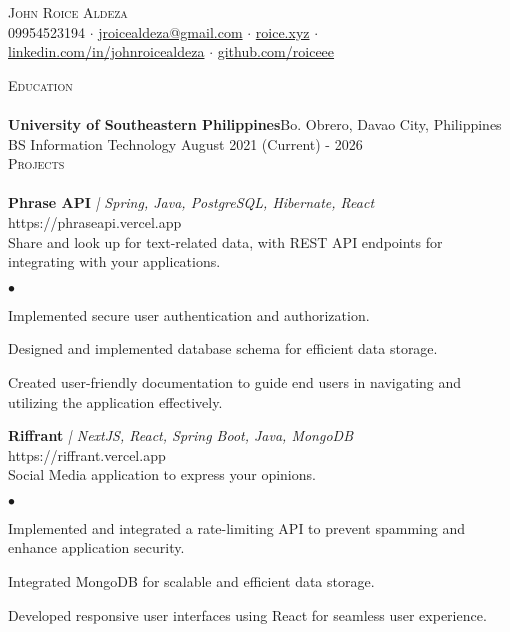 \documentclass[a4paper]{article}
\newcommand{\lineunder} {
        \vspace*{-8pt} \\
        \hspace*{-18pt} \hrulefill \\
    }
\newcommand{\header} [1] {
        {\vspace*{4mm} \hspace*{-18pt}\vspace*{8pt} \textsc{#1}}
        \vspace*{-6pt} \lineunder
    }
\newenvironment{achievements}{
        \begin{list}
            {$\bullet$}{\topsep 0pt \itemsep -2pt}}{\vspace*{4pt}
        \end{list}
    }
\begin{document}
    \vspace*{-40pt}

    \vspace*{-10pt}
    \begin{center}
        {\Huge \scshape {John Roice Aldeza}}\\
        \vspace{2mm}
    09954523194 $\cdot$ \href{mailto:jroicealdeza@gmail.com}{jroicealdeza@gmail.com} $\cdot$ \href{https://roice.xyz}{roice.xyz} $\cdot$ \href{https://www.linkedin.com/in/johnroicealdeza}{linkedin.com/in/johnroicealdeza} $\cdot$ \href{
    https://wwww.github.com/roiceee
    }{github.com/roiceee}
    \end{center}

    \header{Education}
    \textbf{University of Southeastern Philippines}\hfill Bo. Obrero, Davao City, Philippines\\
    BS Information Technology \hfill August 2021 (Current) - 2026\\


    \header{Projects}

    {\textbf{Phrase API}} {\sl | Spring, Java, PostgreSQL, Hibernate, React} \hfill https://phraseapi.vercel.app\\
    \vspace{1mm}
    Share and look up for text-related data, with REST API endpoints for integrating with your applications.\\
    \begin{achievements}
        \item Implemented secure user authentication and authorization.
        \item Designed and implemented database schema for efficient data storage.
        \item Created user-friendly documentation to guide end users in navigating and utilizing the application effectively.
    \end{achievements}
    \vspace*{3mm}

    {\textbf{Riffrant}} {\sl | NextJS, React, Spring Boot, Java, MongoDB} \hfill https://riffrant.vercel.app\\
    \vspace{1mm}
    Social Media application to express your opinions.\\
    \begin{achievements}
       \item Implemented and integrated a rate-limiting API to prevent spamming and enhance application security.
        \item Integrated MongoDB for scalable and efficient data storage.
        \item Developed responsive user interfaces using React for seamless user experience.
    \end{achievements}
    \vspace*{3mm}
\end{document}
